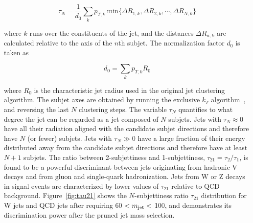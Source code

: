 \begin{equation}
\tau_N = \frac{1}{d_0} \sum_{k} p_{T,k}~\mathrm{min} \{\Delta R_{1,k},\Delta R_{2,k},\cdots,\Delta R_{N,k}\}
\end{equation}

where $k$ runs over the constituents of the jet, and the distances $\Delta R_{n,k}$ are calculated relative to the axis of the $n$th subjet. %
The normalization factor $d_0$ is taken as

\begin{equation}
d_0 = \sum_{k} p_{T,k} R_{0}
\end{equation}

where $R_0$ is the characteristic jet radius used in the original jet clustering algorithm. The subjet axes are obtained by running the exclusive $k_T$ algorithm~\cite{Ellis:1993tq}, and reversing the last $N$ clustering steps. The variable $\tau_N$ quantifies to what degree the jet can be regarded as a jet composed of $N$ subjets. Jets with $\tau_N \approx 0$ have all their radiation aligned with the candidate subjet directions and therefore have $N$ (or fewer) subjets. Jets with $\tau_N \gg 0$ have a large fraction of their energy distributed away from the candidate subjet directions and therefore have at least $N+1$ subjets.
The ratio between 2-subjettiness and 1-subjettiness, $\tau_{21} = \tau_{2}/\tau_{1}$, is found to be a powerful discriminant between jets originating from hadronic V decays and from gluon and single-quark hadronization. Jets from W or Z decays in signal events are characterized by lower values of $\tau_{21}$ relative to QCD background.
Figure~\ref{fig:tau21} shows the $N$-subjettiness ratio $\tau_{21}$ distribution for W jets and QCD jets after requiring 60 $< m_{\text{jet}} <$ 100\GeV, and demonstrates its discrimination power after the pruned jet mass selection. %

